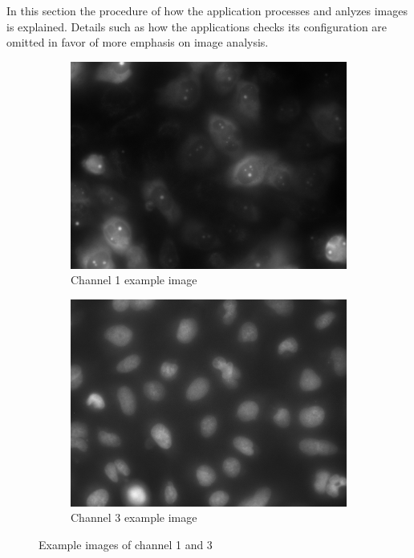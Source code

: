 \documentclass[a4paper, 12pt]{article}
\begin{document}
In this section the procedure of how the application processes and anlyzes
images is explained. Details such as how the applications checks its
configuration are omitted in favor of more emphasis on image analysis.

\begin{figure}[h]
\centering
\begin{subfigure}[b]{0.48\textwidth}
\includegraphics[width=\textwidth]{images/example_Kanal1}
\caption{Channel 1 example image}
\end{subfigure}
\begin{subfigure}[b]{0.48\textwidth}
\includegraphics[width=\textwidth]{images/example_Kanal3}
\caption{Channel 3 example image}
\label{fig:channel3}
\end{subfigure}
\caption{Example images of channel 1 and 3}
\label{fig:example_images}
\end{figure}
\end{document}
